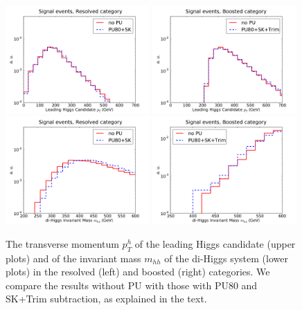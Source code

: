 \begin{figure}[t]
  \begin{center}
  \includegraphics[width=0.49\textwidth]{plots/pt_H0_C2_res_comp.pdf}
  \includegraphics[width=0.49\textwidth]{plots/pt_H0_C2_bst_comp.pdf}
  \includegraphics[width=0.49\textwidth]{plots/m_HH_C2_res_comp.pdf}
  \includegraphics[width=0.49\textwidth]{plots/m_HH_C2_bst_comp.pdf}
  \caption{\small
   The
   transverse momentum $p_T^h$ of the leading
    Higgs candidate (upper plots) and of the invariant mass $m_{hh}$
    of the di-Higgs system (lower plots) in the resolved
    (left) and boosted (right) categories.
    We compare the results without PU with those with PU80
    and SK+Trim subtraction,
    as explained in the text.
}
\label{fig:mHH_PU}
\end{center}
\end{figure}


